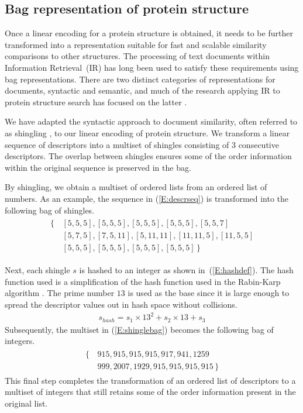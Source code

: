 \documentclass[10pt,letterpaper]{article}
\begin{document}
\subsection*{Bag representation of protein structure}

Once a linear encoding for a protein structure is obtained, it needs to be further transformed into a representation suitable for fast and scalable similarity comparisons to other structures.
The processing of text documents within Information Retrieval~(IR) has long been used to satisfy these requirements using bag representations.
There are two distinct categories of representations for documents, syntactic and semantic, and much of the research applying IR to protein structure search has focused on the latter \cite{Aungand2004,Zhang2010,Budowski2010}. 

We have adapted the syntactic approach to document similarity, often referred to as shingling \cite{Broder1997a}, to our linear encoding of protein structure. 
We transform a linear sequence of descriptors into a multiset of shingles consisting of 3 consecutive descriptors.
The overlap between shingles ensures some of the order information within the original sequence is preserved in the bag. 

By shingling, we obtain a multiset of ordered lists from an ordered list of numbers. 
As an example, the sequence in (\ref{E:descrseq}) is transformed into the following bag of shingles. 
\begin{align}\label{E:shinglebag}
    \begin{split}
        \{\,&[5, 5, 5], [5, 5, 5], [5, 5, 5], [5, 5, 5], [5, 5, 7] \\
            & [5, 7, 5], [7, 5, 11], [5, 11, 11], [11, 11, 5], [11, 5, 5] \\
            & [5, 5, 5], [5, 5, 5], [5, 5, 5], [5, 5, 5] \,\}
    \end{split}
\end{align}

Next, each shingle $s$ is hashed to an integer as shown in~(\ref{E:hashdef}). 
The hash function used is a simplification of the hash function used in the Rabin-Karp algorithm \cite{Karp1987}.
The prime number $13$ is used as the base since it is large enough to spread the descriptor values out in hash space without collisions. 
\begin{gather}\label{E:hashdef}
    s_{hash} = s_1 \times 13^2 + s_2 \times 13 + s_3
\end{gather}
Subsequently, the multiset in (\ref{E:shinglebag}) becomes the following bag of integers.
\begin{align}\label{E:hashbag}
    \begin{split}
    \{\,&915, 915, 915, 915, 917, 941, 1259 \\
        &999, 2007, 1929, 915, 915, 915, 915 \,\}
    \end{split}
\end{align}
This final step completes the transformation of an ordered list of descriptors to a multiset of integers that still retains some of the order information present in the original list. 
\end{document}
